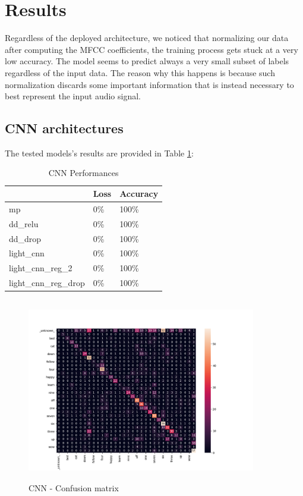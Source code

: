 
\section{Results}
\label{sec:results}

\noindent Regardless of the deployed architecture, we noticed that normalizing our data after computing the MFCC coefficients, the training process gets stuck at a very low accuracy. The model seems to predict always a very small subset of labels regardless of the input data. The reason why this happens is because such normalization discards some important information that is instead necessary to best represent the input audio signal.

\subsection{\textbf{CNN architectures}}
The tested models's results are provided in Table \ref{table:cnn_performances}:\\
\begin{table}[h!]
\centering
\begin{tabular}{ p{3cm}|p{1.5cm}|p{1.5cm}| }
 \hline
   & Loss & Accuracy\\
\hline
mp & 0\% & 100\%  \\
dd\_relu & 0\% & 100\% \\
dd\_drop & 0\% & 100\% \\
light\_cnn & 0\% & 100\% \\
light\_cnn\_reg\_2 & 0\% & 100\% \\
light\_cnn\_reg\_drop & 0\% & 100\% \\
\hline
\end{tabular}
\caption{CNN Performances}
\label{table:cnn_performances}
\end{table}

\begin{figure}[h]
			\centering
	    	\includegraphics[width=10cm, height=8cm]{conf_matrix_cnn_dii_cm}
	    	\caption{CNN - Confusion matrix}
	    	\label{fig:conf_matrix_cnn}
\end{figure} 



